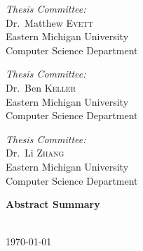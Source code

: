 \begin{titlepage}
\begin{center}
        \begin{minipage}{0.32\textwidth}
            \begin{flushleft} \large
                \emph{Thesis Committee:}\\
                Dr.~Matthew \textsc{Evett} \\
                \small Eastern Michigan University\\
                \small Computer Science Department \\
            \end{flushleft}
        \end{minipage}
        \begin{minipage}{0.32\textwidth}
            \begin{center} \large
                \emph{Thesis Committee:} \\
                Dr.~Ben \textsc{Keller}\\
                \small Eastern Michigan University\\
                \small Computer Science Department
            \end{center}
        \end{minipage}
        \begin{minipage}{0.32\textwidth}
            \begin{flushright} \large
                \emph{Thesis Committee:} \\
                Dr.~Li \textsc{Zhang}\\
                \small Eastern Michigan University\\
                \small Computer Science Department
            \end{flushright}
        \end{minipage}

        \vfill
        { \large \textbf{Abstract Summary}}\\		

		\begin{center}
		\end{center}
	
    
        \HRule\\[0.5cm]
        { \large \today }
    \end{center}
\end{titlepage}
